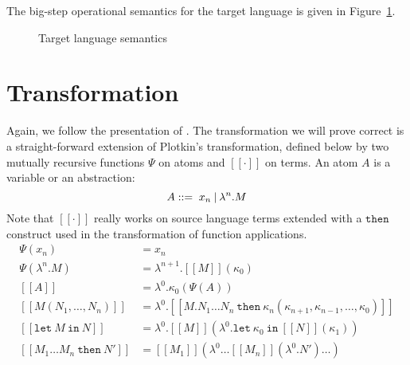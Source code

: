\documentclass[a4paper,11pt,draft]{article}
\newcommand{\kw}[1]{\mathtt{#1}}
\begin{document}
The big-step operational semantics for the target language is given in
Figure~\ref{fig:targetsemantics}.

\begin{figure}
\caption{Target language semantics}
\label{fig:targetsemantics}
\end{figure}


\section{Transformation}\label{sec:transformation}

Again, we follow the presentation of \cite{Dargaye-Leroy-07}. The transformation
we will prove correct is a straight-forward extension of
Plotkin's transformation, defined below by two mutually recursive functions
$\Psi$ on atoms and $[\![\cdot]\!]$ on terms. An atom $A$ is a variable or an
abstraction:
\begin{equation*}
A ::= \; x_{n} \: \text{\textbar} \: \lambda^{n}.M
\end{equation*}
Note that $[\![\cdot]\!]$ really works on source language terms extended with
a $\kw{then}$ construct used in the transformation of function applications.
\begin{align*}
\Psi(x_{n}) &=
  x_{n} \\
\Psi(\lambda^{n}.M) &=
  \lambda^{n+1}.[\![M]\!](\kappa_{0}) \\[1em]
[\![A]\!] &=
  \lambda^{0}.\kappa_{0} (\Psi(A)) \\
[\![M(N_{1}, \ldots, N_{n})]\!] &=
  \lambda^{0}.[\![M . N_{1} \ldots N_{n} \: \kw{then} \:
  \kappa_{n}(\kappa_{n+1}, \kappa_{n-1}, \ldots, \kappa_{0})]\!] \\
[\![\kw{let} \: M \: \kw{in} \: N]\!] &=
  \lambda^{0}.[\![M]\!] (\lambda^{0}.\kw{let} \:
  \kappa_{0} \: \kw{in} \: [\![N]\!] (\kappa_{1})) \\
[\![M_{1} \ldots M_{n} \: \kw{then} \: N']\!] &=
  [\![M_{1}]\!] (\lambda^{0} \ldots [\![M_{n}]\!] (\lambda^{0}.N') \ldots )
\end{align*}
\end{document}
